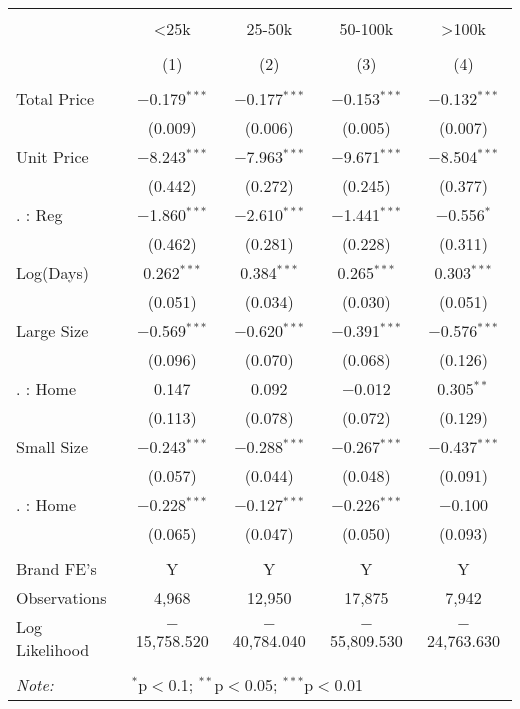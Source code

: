 
\begin{table}[!htbp] \centering 
  \caption{} 
  \label{} 
\begin{tabular}{@{\extracolsep{5pt}}lcccc} 
\\[-1.8ex]\hline 
\hline \\[-1.8ex] 
 & <25k & 25-50k & 50-100k & >100k \\ 
\\[-1.8ex] & (1) & (2) & (3) & (4)\\ 
\hline \\[-1.8ex] 
 Total Price & $-$0.179$^{***}$ & $-$0.177$^{***}$ & $-$0.153$^{***}$ & $-$0.132$^{***}$ \\ 
  & (0.009) & (0.006) & (0.005) & (0.007) \\ 
  Unit Price & $-$8.243$^{***}$ & $-$7.963$^{***}$ & $-$9.671$^{***}$ & $-$8.504$^{***}$ \\ 
  & (0.442) & (0.272) & (0.245) & (0.377) \\ 
  . : Reg & $-$1.860$^{***}$ & $-$2.610$^{***}$ & $-$1.441$^{***}$ & $-$0.556$^{*}$ \\ 
  & (0.462) & (0.281) & (0.228) & (0.311) \\ 
  Log(Days) & 0.262$^{***}$ & 0.384$^{***}$ & 0.265$^{***}$ & 0.303$^{***}$ \\ 
  & (0.051) & (0.034) & (0.030) & (0.051) \\ 
  Large Size & $-$0.569$^{***}$ & $-$0.620$^{***}$ & $-$0.391$^{***}$ & $-$0.576$^{***}$ \\ 
  & (0.096) & (0.070) & (0.068) & (0.126) \\ 
  . : Home & 0.147 & 0.092 & $-$0.012 & 0.305$^{**}$ \\ 
  & (0.113) & (0.078) & (0.072) & (0.129) \\ 
  Small Size & $-$0.243$^{***}$ & $-$0.288$^{***}$ & $-$0.267$^{***}$ & $-$0.437$^{***}$ \\ 
  & (0.057) & (0.044) & (0.048) & (0.091) \\ 
  . : Home & $-$0.228$^{***}$ & $-$0.127$^{***}$ & $-$0.226$^{***}$ & $-$0.100 \\ 
  & (0.065) & (0.047) & (0.050) & (0.093) \\ 
 \hline \\[-1.8ex] 
Brand FE's & Y & Y & Y & Y \\ 
Observations & 4,968 & 12,950 & 17,875 & 7,942 \\ 
Log Likelihood & $-$15,758.520 & $-$40,784.040 & $-$55,809.530 & $-$24,763.630 \\ 
\hline 
\hline \\[-1.8ex] 
\textit{Note:}  & \multicolumn{4}{l}{$^{*}$p$<$0.1; $^{**}$p$<$0.05; $^{***}$p$<$0.01} \\ 
\end{tabular} 
\end{table} 

